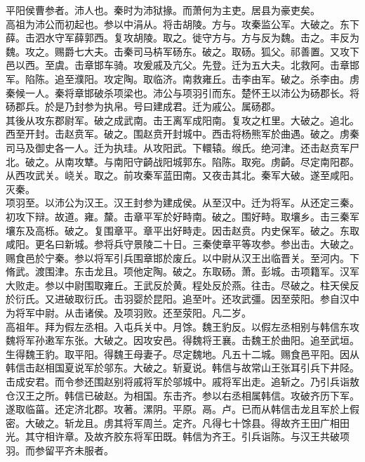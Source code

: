 \documentclass{zhvt-classic}
\begin{document}
\hspace*{2em}平阳侯曹参者。沛人也。秦时为沛狱掾。而萧何为主吏。居县为豪吏矣。\\
\hspace*{2em}高祖为沛公而初起也。参以中涓从。将击胡陵。方与。攻秦监公军。大破之。东下薛。击泗水守军薛郭西。复攻胡陵。取之。徙守方与。方与反为魏。击之。丰反为魏。攻之。赐爵七大夫。击秦司马枿军砀东。破之。取砀。狐父。祁善置。又攻下邑以西。至虞。击章邯车骑。攻爰戚及亢父。先登。迁为五大夫。北救阿。击章邯军。陷陈。追至濮阳。攻定陶。取临济。南救雍丘。击李由军。破之。杀李由。虏秦候一人。秦将章邯破杀项梁也。沛公与项羽引而东。楚怀王以沛公为砀郡长。将砀郡兵。於是乃封参为执帛。号曰建成君。迁为戚公。属砀郡。\\
\hspace*{2em}其後从攻东郡尉军。破之成武南。击王离军成阳南。复攻之杠里。大破之。追北。西至开封。击赵贲军。破之。围赵贲开封城中。西击将杨熊军於曲遇。破之。虏秦司马及御史各一人。迁为执珪。从攻阳武。下轘辕。缑氏。绝河津。还击赵贲军尸北。破之。从南攻犨。与南阳守齮战阳城郭东。陷陈。取宛。虏齮。尽定南阳郡。从西攻武关。峣关。取之。前攻秦军蓝田南。又夜击其北。秦军大破。遂至咸阳。灭秦。\\
\hspace*{2em}项羽至。以沛公为汉王。汉王封参为建成侯。从至汉中。迁为将军。从还定三秦。初攻下辩。故道。雍。斄。击章平军於好畤南。破之。围好畤。取壤乡。击三秦军壤东及高栎。破之。复围章平。章平出好畤走。因击赵贲。内史保军。破之。东取咸阳。更名曰新城。参将兵守景陵二十日。三秦使章平等攻参。参出击。大破之。赐食邑於宁秦。参以将军引兵围章邯於废丘。以中尉从汉王出临晋关。至河内。下脩武。渡围津。东击龙且。项他定陶。破之。东取砀。萧。彭城。击项籍军。汉军大败走。参以中尉围取雍丘。王武反於黄。程处反於燕。往击。尽破之。柱天侯反於衍氏。又进破取衍氏。击羽婴於昆阳。追至叶。还攻武彊。因至荥阳。参自汉中为将军中尉。从击诸侯。及项羽败。还至荥阳。凡二岁。\\
\hspace*{2em}高祖年。拜为假左丞相。入屯兵关中。月馀。魏王豹反。以假左丞相别与韩信东攻魏将军孙遫军东张。大破之。因攻安邑。得魏将王襄。击魏王於曲阳。追至武垣。生得魏王豹。取平阳。得魏王母妻子。尽定魏地。凡五十二城。赐食邑平阳。因从韩信击赵相国夏说军於邬东。大破之。斩夏说。韩信与故常山王张耳引兵下井陉。击成安君。而令参还围赵别将戚将军於邬城中。戚将军出走。追斩之。乃引兵诣敖仓汉王之所。韩信已破赵。为相国。东击齐。参以右丞相属韩信。攻破齐历下军。遂取临菑。还定济北郡。攻著。漯阴。平原。鬲。卢。已而从韩信击龙且军於上假密。大破之。斩龙且。虏其将军周兰。定齐。凡得七十馀县。得故齐王田广相田光。其守相许章。及故齐胶东将军田既。韩信为齐王。引兵诣陈。与汉王共破项羽。而参留平齐未服者。\\
\end{document}
